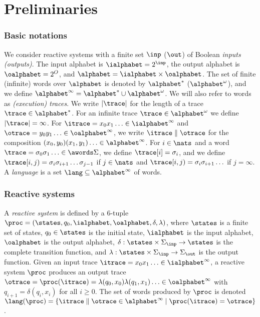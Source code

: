 \section{Preliminaries}
\label{sec_prel}

\subsubsection{\textbf{Basic notations}}
We consider reactive systems with a finite set
$\inp$ ($\out$) of Boolean \emph{inputs (outputs)}.
The input alphabet is
$\ialphabet=2^\inp$, the output alphabet is $\oalphabet=2^O$, and
$\alphabet=\ialphabet \times \oalphabet$. The set of finite (infinite) words
over $\alphabet$ is denoted by $\alphabet^*$ ($\alphabet^\omega$), and
we define $\alphabet^{\infty} = \alphabet^* \cup \alphabet^\omega$.  We will also refer
to words as \emph{(execution) traces}.  We write $|\trace|$ for the
length of a trace $\trace\in \alphabet^*$. For an infinite trace $\trace\in \alphabet^\omega$ we define $|\trace| =\infty$. For $\itrace = x_0
x_1 \ldots \in \ialphabet^\infty$ and $\otrace = y_0 y_1 \ldots \in
\oalphabet^\infty$, we write $\itrace \parallel \otrace$ for the
composition $(x_0,y_0) (x_1,y_1) \ldots \in \alphabet^\infty$.
For $i \in \nats$ and a word $\trace = \sigma_0\sigma_1\ldots \in \awords\Sigma$, we define $\trace[i] = \sigma_i$, and we define $\trace[i,j) = \sigma_i\sigma_{i+1}\ldots\sigma_{j-1}$ if $j \in \nats$ and $\trace[i,j) = \sigma_i\sigma_{i+1}\ldots$ if $j = \infty$.
A \emph{language} is a set $\lang
\subseteq  \alphabet^\infty$ of words.

\iffalse
\subsubsection{Reactive systems}

A \emph{reactive system} is defined by a
6-tuple $\proc = (\states,q_{0},\ialphabet,\oalphabet,\delta,\lambda)$,
where
$\states$ is a finite set of states,
$q_{0} \in \states$ is the initial state,
$\ialphabet$ is the input alphabet,
$\oalphabet$ is the output alphabet,
$\delta: \states \times \Sigma_{\inp} \to \states$ is the complete transition function, and $\lambda : \states \times \Sigma_{\inp} \to \Sigma_{\out}$ is the output function.
%
Given an input trace $\itrace = x_0 x_1 \ldots \in \ialphabet^\infty$, a reactive system $\mathcal{\proc}$ produces an
output trace $\otrace = \mathcal{\proc}(\itrace) = \lambda(q_0, x_0)
\lambda(q_1, x_1) \ldots \in \oalphabet^\infty$ with $q_{i+1} = \delta(q_i, x_i)$ for all $i \ge 0$.
The set of words produced by
$\mathcal{\proc}$ is denoted $\lang(\mathcal{\proc}) = \{\itrace \parallel \otrace \in
\alphabet^\infty \mid \mathcal{\proc}(\itrace) = \otrace\}$.


